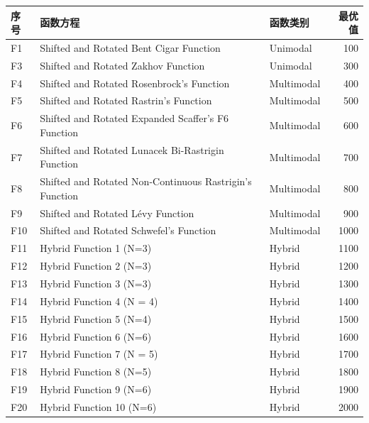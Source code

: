 \documentclass{wzuthesis}
\begin{document}
\begin{table}[ht]
\centering
\small
{}
\label{tb:CEC2017-functions}
\begin{tabular}{l l l r}
\toprule
\textbf{序号} & \textbf{函数方程} & \textbf{函数类别} & \textbf{最优值} \\
\midrule
F1  & Shifted and Rotated Bent Cigar Function          & Unimodal    & 100   \\
F3  & Shifted and Rotated Zakhov Function              & Unimodal    & 300   \\
F4  & Shifted and Rotated Rosenbrock's Function        & Multimodal  & 400      \\
F5  & Shifted and Rotated Rastrin's Function           & Multimodal  & 500   \\
F6  & Shifted and Rotated Expanded Scaffer's F6 Function & Multimodal  & 600   \\
F7  & Shifted and Rotated Lunacek Bi-Rastrigin Function  & Multimodal  & 700   \\
F8  & Shifted and Rotated Non-Continuous Rastrigin's Function & Multimodal & 800   \\
F9  & Shifted and Rotated Lévy Function                & Multimodal  & 900   \\
F10  & Shifted and Rotated Schwefel's Function          & Multimodal  & 1000  \\
F11 & Hybrid Function 1 (N=3)                          & Hybrid      & 1100  \\
F12 & Hybrid Function 2 (N=3)                          & Hybrid      & 1200  \\
F13 & Hybrid Function 3 (N=3)                          & Hybrid      & 1300  \\
F14 & Hybrid Function 4 (N = 4)                        & Hybrid      & 1400  \\
F15 & Hybrid Function 5 (N=4)                          & Hybrid      & 1500  \\
F16 & Hybrid Function 6 (N=6)                          & Hybrid      & 1600  \\
F17 & Hybrid Function 7 (N = 5)                        & Hybrid      & 1700  \\
F18 & Hybrid Function 8 (N=5)                          & Hybrid      & 1800      \\
F19 & Hybrid Function 9 (N=6)                         & Hybrid      & 1900  \\
F20 & Hybrid Function 10 (N=6)                         & Hybrid      & 2000  \\

\end{tabular}
\end{table}
\end{document}
